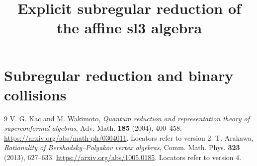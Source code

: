 \documentclass[11pt,oneside]{memoir}
\title{Explicit subregular reduction of the affine sl3 algebra}
\author{}\date{}
\begin{document}
\chapter{Subregular reduction and binary collisions}

\begin{thebibliography}{9}
 V. G. Kac and M. Wakimoto, \emph{Quantum reduction and representation theory of superconformal algebras}, Adv. Math. \textbf{185} (2004), 400--458. \url{https://arxiv.org/abs/math-ph/0304011}. Locators refer to version 2.
 T. Arakawa, \emph{Rationality of Bershadsky--Polyakov vertex algebras}, Comm. Math. Phys. \textbf{323} (2013), 627--633. \url{https://arxiv.org/abs/1005.0185}. Locators refer to version 4.
\end{thebibliography}
\end{document}
